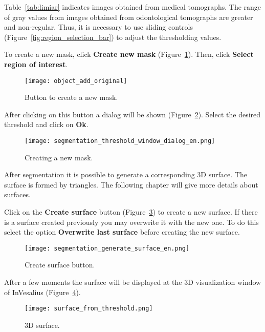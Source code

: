 Table~\ref{tab:limiar} indicates images obtained from medical tomographs. The range of gray values from images obtained from odontological tomographs are greater and non-regular. Thus, it is necessary to use sliding controls (Figure~\ref{fig:region_selection_bar}) to adjust the thresholding values.

To create a new mask, click \textbf{Create new mask} (Figure~\ref{fig:shortcut_new_mask}). Then, click \textbf{Select region of interest}.

\begin{figure}[!htb]
\centering
\texttt{[image: object\_add\_original]}
\caption{Button to create a new mask.}
\label{fig:shortcut_new_mask}
\end{figure}

After clicking on this button a dialog will be shown (Figure~\ref{fig:create_new_mask}). Select the desired threshold and click on \textbf{Ok}.

\begin{figure}[!htb]
\centering
\texttt{[image: segmentation\_threshold\_window\_dialog\_en.png]}
\caption{Creating a new mask.}
\label{fig:create_new_mask}
\end{figure}

\newpage

After segmentation it is possible to generate a corresponding 3D surface. The surface is formed by triangles. The following chapter will give more details about surfaces.

Click on the \textbf{Create surface} button (Figure~\ref{fig:generate_surface}) to create a new surface. If there is a surface created previously you may overwrite it with the new one. To do this select the option \textbf{Overwrite last surface} before creating the new surface.

\begin{figure}[!htb]
\centering
\texttt{[image: segmentation\_generate\_surface\_en.png]}
\caption{Create surface button.}
\label{fig:generate_surface}
\end{figure}

After a few moments the surface will be displayed at the 3D visualization window of InVesalius (Figure~\ref{fig:surface}).

\begin{figure}[!htb]
\centering
\texttt{[image: surface\_from\_threshold.png]}
\caption{3D surface.}
\label{fig:surface}
\end{figure}



